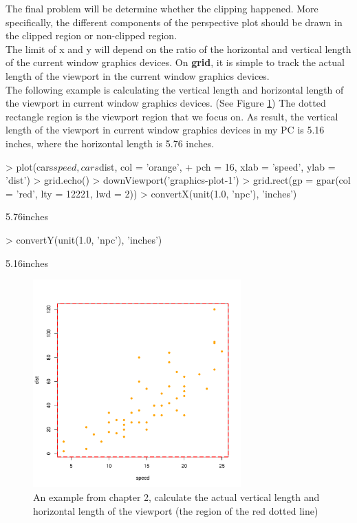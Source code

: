 \documentclass[11pt,twoside]{report}
\begin{document}
The final problem will be determine whether the clipping happened. More specifically, the different components of the perspective plot should be drawn in the clipped region or non-clipped region.\\

The limit of x and y will depend on the ratio of the horizontal and vertical length of the current window graphics devices. On \textbf{grid}, it is simple to track the actual length of the viewport in the current window graphics devices. \\

The following example is calculating the vertical length and horizontal length of the viewport in current window graphics devices. (See Figure \ref{figure_4.2}) The dotted rectangle region is the viewport region that we focus on. As result, the vertical length of the viewport in current window graphics devices in my PC is 5.16 inches, where the horizontal length is 5.76 inches. 
\begin{Schunk}
\begin{Sinput}
> plot(cars$speed, cars$dist, col = 'orange', 
+       pch = 16, xlab = 'speed', ylab = 'dist')
> grid.echo()
> downViewport('graphics-plot-1')
> grid.rect(gp = gpar(col = 'red', lty = 12221, lwd = 2))
> convertX(unit(1.0, 'npc'), 'inches')
\end{Sinput}
\begin{Soutput}
[1] 5.76inches
\end{Soutput}
\begin{Sinput}
> convertY(unit(1.0, 'npc'), 'inches')
\end{Sinput}
\begin{Soutput}
[1] 5.16inches
\end{Soutput}
\end{Schunk}

\begin{figure}[h]
	\begin{center}
		\includegraphics[height = 8cm, width = 8cm]{figure/gridGraphics_persp_demo_1.pdf}
		\caption{An example from chapter 2, calculate the actual vertical length and horizontal length of the viewport (the region of the red dotted line)}
		\label{figure_4.2}
	\end{center}
\end{figure}
\end{document}
